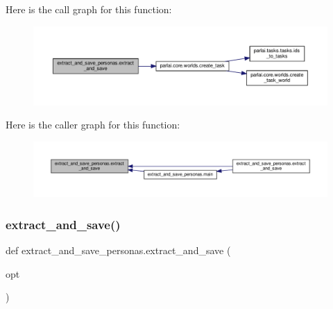 Here is the call graph for this function\+:
\nopagebreak
\begin{figure}[H]
\begin{center}
\leavevmode
\includegraphics[width=350pt]{namespaceextract__and__save__personas_a8de429c2a432ebaa5185e44fe39a1f73_cgraph}
\end{center}
\end{figure}
Here is the caller graph for this function\+:
\nopagebreak
\begin{figure}[H]
\begin{center}
\leavevmode
\includegraphics[width=350pt]{namespaceextract__and__save__personas_a8de429c2a432ebaa5185e44fe39a1f73_icgraph}
\end{center}
\end{figure}
\mbox{\label{namespaceextract__and__save__personas_af6196a0605098280a6766f0f9a99e4b5}} 
\subsubsection{\texorpdfstring{extract\+\_\+and\+\_\+save()}{extract\_and\_save()}\hspace{0.1cm}{\footnotesize\ttfamily [2/2]}}
{\footnotesize\ttfamily def extract\+\_\+and\+\_\+save\+\_\+personas.\+extract\+\_\+and\+\_\+save (\begin{DoxyParamCaption}\item[{}]{opt }\end{DoxyParamCaption})}



